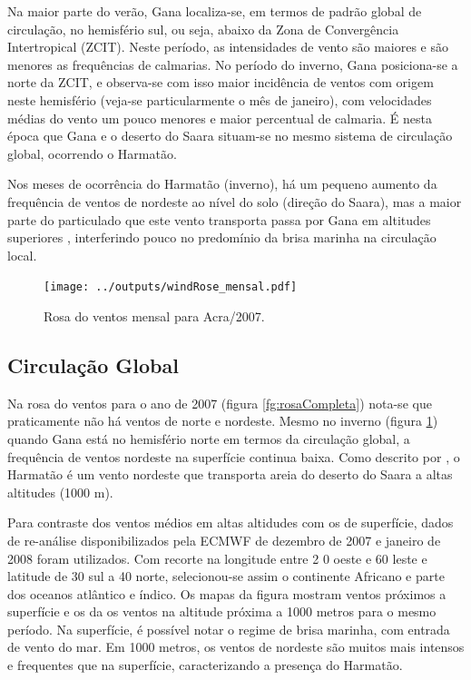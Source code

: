 Na maior parte do verão, Gana localiza-se, em termos de padrão global de 
circulação, no hemisfério sul, ou seja, abaixo da Zona de Convergência 
Intertropical (ZCIT). Neste período, as intensidades de vento são maiores e 
são menores as frequências de calmarias. No período do inverno, Gana 
posiciona-se a norte da ZCIT, e observa-se com isso maior incidência de 
ventos com origem neste hemisfério (veja-se particularmente o mês 
de janeiro), 
com velocidades médias do vento um pouco menores e maior percentual
de calmaria. É nesta época que Gana e o deserto do Saara situam-se no mesmo 
sistema de circulação global, ocorrendo o Harmatão. 

Nos meses de ocorrência do Harmatão (inverno), há um pequeno aumento da 
frequência de ventos de nordeste ao nível do solo (direção do Saara), mas a 
maior parte do particulado que este vento transporta passa por Gana em 
altitudes superiores \citep{breuning2005}, interferindo pouco no predomínio 
da brisa marinha na circulação local.%

\begin{figure}[H]
  \centering
  \texttt{[image: ../outputs/windRose\_mensal.pdf]}
  \caption{Rosa do ventos mensal para Acra/2007. \label{fig:windRose_mensal}}
\end{figure}

\newpage
\subsection{Circulação Global}

Na rosa do ventos para o ano de 2007 (figura \ref{fg:rosaCompleta}) nota-se 
que praticamente não há ventos de norte e nordeste. Mesmo no inverno 
(figura \ref{fig:windRose_mensal}) quando Gana está no hemisfério norte em 
termos da circulação global, a frequência de ventos nordeste na superfície 
continua baixa. 
Como descrito por \citet{breuning2005}, o Harmatão é um vento nordeste 
que transporta areia do deserto do Saara a altas altitudes (1000 m).

Para contraste dos ventos médios em altas altidudes com os de superfície, 
dados de re-análise disponibilizados pela ECMWF de dezembro de 
2007 e janeiro de 2008 foram utilizados. Com recorte na longitude entre 2
0 oeste e 60 leste e latitude de 30 sul a 40 norte, selecionou-se assim o 
continente Africano e parte dos oceanos atlântico e índico. 
Os mapas da figura \label{fig:ECMWF10} mostram
ventos próximos a superfície e os da \label{fig:ECMWF1000} os ventos na altitude 
próxima a 1000 metros para o mesmo período. 
Na superfície, é possível notar o regime de brisa marinha, com entrada de vento 
do mar. Em 1000 metros, os ventos de nordeste são muitos mais intensos e 
frequentes que na superfície, caracterizando a presença do Harmatão. 

